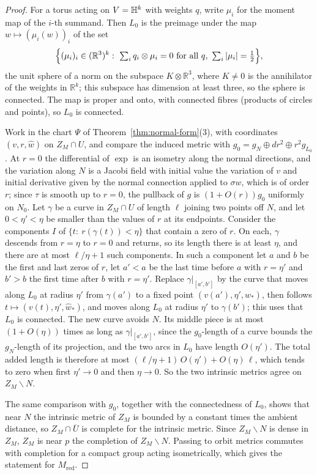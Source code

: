 \begin{proof}
For a torus acting on $V=\mathbb H^k$ with weights $q$, write $\mu_i$ for the moment map of the
$i$-th summand. Then $L_0$ is the preimage under the map $w\mapsto(\mu_i(w))_i$ of the set
\[
 \Bigl\{(\mu_i)_i\in(\mathbb R^3)^k:\ \textstyle\sum_iq_i\otimes\mu_i=0\ \text{for all }q,\
 \sum_i|\mu_i|=\tfrac12\Bigr\},
\]
the unit sphere of a norm on the subspace $K\otimes\mathbb R^3$, where $K\neq0$ is the annihilator
of the weights in $\mathbb R^k$; this subspace has dimension at least three, so the sphere is
connected. The map is proper and onto, with connected fibres (products of circles and points),
so $L_0$ is connected.

Work in the chart $\Psi$ of Theorem~\ref{thm:normal-form}(3), with coordinates $(v,r,\hat w)$ on
$Z_M\cap U$, and compare the induced metric with $g_0=g_N\oplus dr^2\oplus r^2g_{L_0}$. At $r=0$
the differential of $\exp$ is an isometry along the normal directions, and the variation along
$N$ is a Jacobi field with initial value the variation of $v$ and initial derivative given by the
normal connection applied to $\sigma w$, which is of order $r$; since $\tau$ is smooth up to
$r=0$, the pullback of $g$ is $(1+O(r))g_0$ uniformly on $N_0$. Let $\gamma$ be a curve in $Z_M\cap
U$ of length $\ell$ joining two points off $N$, and let $0<\eta'<\eta$ be smaller than the
values of $r$ at its endpoints. Consider the components $I$ of $\{t:\ r(\gamma(t))<\eta\}$ that
contain a zero of $r$. On each, $\gamma$ descends from $r=\eta$ to $r=0$ and returns, so its
length there is at least $\eta$, and there are at most $\ell/\eta+1$ such components. In such a
component let $a$ and $b$ be the first and last zeros of $r$, let $a'<a$ be the last time
before $a$ with $r=\eta'$ and $b'>b$ the first time after $b$ with $r=\eta'$. Replace
$\gamma|_{[a',b']}$ by the curve that moves along $L_0$ at radius $\eta'$ from $\gamma(a')$ to a
fixed point $(v(a'),\eta',\hat w_*)$, then follows $t\mapsto(v(t),\eta',\hat w_*)$, and moves
along $L_0$ at radius $\eta'$ to $\gamma(b')$; this uses that $L_0$ is connected. The new curve
avoids $N$. Its middle piece is at most $(1+O(\eta))$ times as long as $\gamma|_{[a',b']}$,
since the $g_0$-length of a curve bounds the $g_N$-length of its projection, and the two arcs in
$L_0$ have length $O(\eta')$. The total added length is therefore at most
$(\ell/\eta+1)\,O(\eta')+O(\eta)\,\ell$, which tends to zero when first $\eta'\to0$ and then
$\eta\to0$. So the two intrinsic metrics agree on $Z_M\smallsetminus N$.

The same comparison with $g_0$, together with the connectedness of $L_0$, shows that near $N$
the intrinsic metric of $Z_M$ is bounded by a constant times the ambient distance, so
$Z_M\cap\overline U$ is complete for the intrinsic metric. Since $Z_M\smallsetminus N$ is dense in
$Z_M$, $Z_M$ is near $p$ the completion of $Z_M\smallsetminus N$. Passing to orbit metrics commutes with completion
for a compact group acting isometrically, which gives the statement for $M_{\mathrm{red}}$.
\end{proof}

